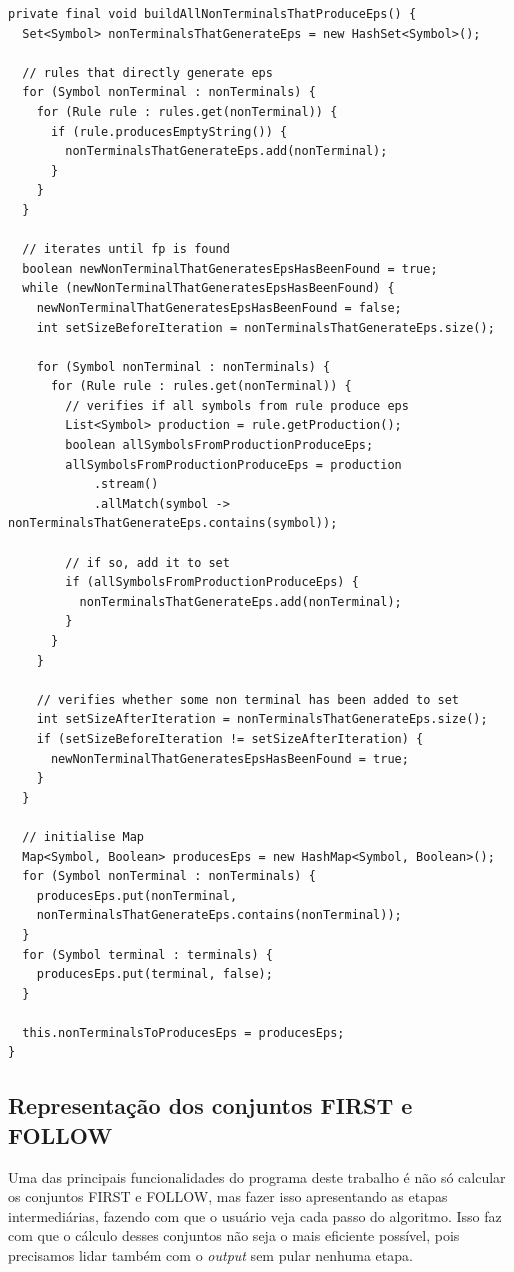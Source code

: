 \documentclass[11pt]{article}
\begin{document}
\begin{verbatim}
private final void buildAllNonTerminalsThatProduceEps() {
  Set<Symbol> nonTerminalsThatGenerateEps = new HashSet<Symbol>();

  // rules that directly generate eps
  for (Symbol nonTerminal : nonTerminals) {
    for (Rule rule : rules.get(nonTerminal)) {
      if (rule.producesEmptyString()) {
        nonTerminalsThatGenerateEps.add(nonTerminal);
      }
    }
  }

  // iterates until fp is found
  boolean newNonTerminalThatGeneratesEpsHasBeenFound = true;
  while (newNonTerminalThatGeneratesEpsHasBeenFound) {
    newNonTerminalThatGeneratesEpsHasBeenFound = false;
    int setSizeBeforeIteration = nonTerminalsThatGenerateEps.size();

    for (Symbol nonTerminal : nonTerminals) {
      for (Rule rule : rules.get(nonTerminal)) {
        // verifies if all symbols from rule produce eps
        List<Symbol> production = rule.getProduction();
        boolean allSymbolsFromProductionProduceEps;
        allSymbolsFromProductionProduceEps = production
            .stream()
            .allMatch(symbol -> nonTerminalsThatGenerateEps.contains(symbol));

        // if so, add it to set
        if (allSymbolsFromProductionProduceEps) {
          nonTerminalsThatGenerateEps.add(nonTerminal);
        }
      }
    }

    // verifies whether some non terminal has been added to set
    int setSizeAfterIteration = nonTerminalsThatGenerateEps.size();
    if (setSizeBeforeIteration != setSizeAfterIteration) {
      newNonTerminalThatGeneratesEpsHasBeenFound = true;
    }
  }

  // initialise Map
  Map<Symbol, Boolean> producesEps = new HashMap<Symbol, Boolean>();
  for (Symbol nonTerminal : nonTerminals) {
    producesEps.put(nonTerminal, 
    nonTerminalsThatGenerateEps.contains(nonTerminal));
  }
  for (Symbol terminal : terminals) {
    producesEps.put(terminal, false);
  }

  this.nonTerminalsToProducesEps = producesEps;
}
\end{verbatim}

\subsection{Representação dos conjuntos FIRST e FOLLOW}
\label{sec:orgheadline7}
Uma das principais funcionalidades do programa deste trabalho é não só calcular
os conjuntos FIRST e FOLLOW, mas fazer isso apresentando as etapas
intermediárias, fazendo com que o usuário veja cada passo do algoritmo. Isso faz
com que o cálculo desses conjuntos não seja o mais eficiente possível, pois
precisamos lidar também com o \emph{output} sem pular nenhuma etapa.
\end{document}
